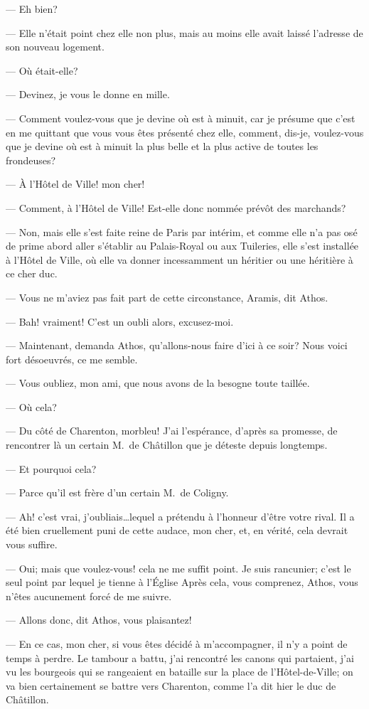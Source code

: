 — Eh bien?

— Elle n'était point chez elle non plus, mais au moins elle avait laissé l'adresse de son nouveau logement.

— Où était-elle?

— Devinez, je vous le donne en mille.

— Comment voulez-vous que je devine où est à minuit, car je présume que c'est en me quittant que vous vous êtes présenté chez elle, comment, dis-je, voulez-vous que je devine où est à minuit la plus belle et la plus active de toutes les frondeuses?

— À l'Hôtel de Ville! mon cher!

— Comment, à l'Hôtel de Ville! Est-elle donc nommée prévôt des marchands?

— Non, mais elle s'est faite reine de Paris par intérim, et comme elle n'a pas osé de prime abord aller s'établir au Palais-Royal ou aux Tuileries, elle s'est installée à l'Hôtel de Ville, où elle va donner incessamment un héritier ou une héritière à ce cher duc.

— Vous ne m'aviez pas fait part de cette circonstance, Aramis, dit Athos.

— Bah! vraiment! C'est un oubli alors, excusez-moi.

— Maintenant, demanda Athos, qu'allons-nous faire d'ici à ce soir? Nous voici fort désoeuvrés, ce me semble.

— Vous oubliez, mon ami, que nous avons de la besogne toute taillée.

— Où cela?

— Du côté de Charenton, morbleu! J'ai l'espérance, d'après sa promesse, de rencontrer là un certain M.~de Châtillon que je déteste depuis longtemps.

— Et pourquoi cela?

— Parce qu'il est frère d'un certain M.~de Coligny.

— Ah! c'est vrai, j'oubliais\dots lequel a prétendu à l'honneur d'être votre rival. Il a été bien cruellement puni de cette audace, mon cher, et, en vérité, cela devrait vous suffire.

— Oui; mais que voulez-vous! cela ne me suffit point. Je suis rancunier; c'est le seul point par lequel je tienne à l'Église Après cela, vous comprenez, Athos, vous n'êtes aucunement forcé de me suivre.

— Allons donc, dit Athos, vous plaisantez!

— En ce cas, mon cher, si vous êtes décidé à m'accompagner, il n'y a point de temps à perdre. Le tambour a battu, j'ai rencontré les canons qui partaient, j'ai vu les bourgeois qui se rangeaient en bataille sur la place de l'Hôtel-de-Ville; on va bien certainement se battre vers Charenton, comme l'a dit hier le duc de Châtillon.

